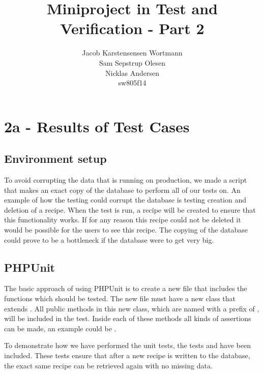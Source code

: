 

\title{Miniproject in Test and Verification - Part 2}
\author{Jacob Karstensensen Wortmann\\Sam Sepstrup Olesen\\Nicklas Andersen\\sw805f14}


\maketitle %
\section*{2a - Results of Test Cases}

\subsection*{Environment setup}
To avoid corrupting the data that is running on production, we made a script that makes an exact copy of the database to perform all of our tests on. An example of how the testing could corrupt the database is testing creation and deletion of a recipe.
When the test is run, a recipe will be created to ensure that this functionality works. 
If for any reason this recipe could not be deleted it would be possible for the users to see this recipe. 
The copying of the database could prove to be a bottleneck if the database were to get very big.

\subsection*{PHPUnit}
The basic approach of using PHPUnit is to create a new file that includes the functions which should be tested. The new file must have a new class that extends . All public methods in this new class, which are named with a prefix of , will be included in the test. Inside each of these methods all kinds of assertions can be made, an example could be .

To demonstrate how we have performed the unit tests, the tests \linebreak{} and  have been included. These tests ensure that after a new recipe is written to the database, the exact same recipe can be retrieved again with no missing data.

